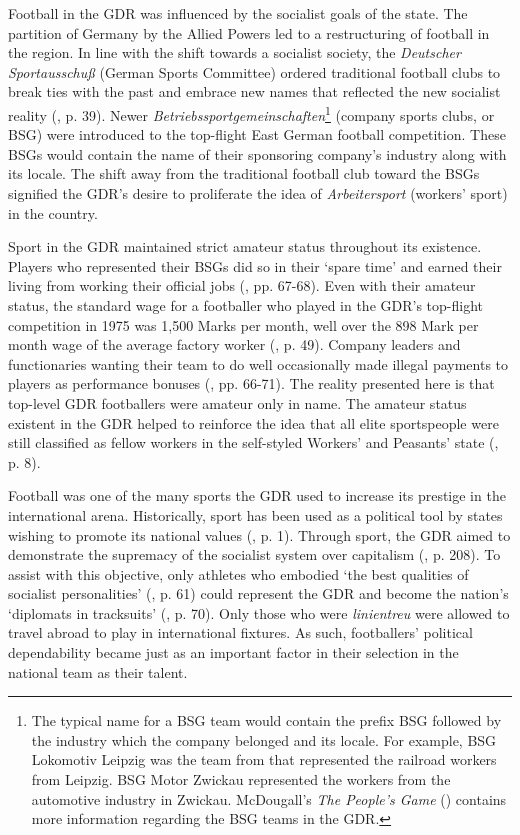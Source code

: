 Football in the GDR was influenced by the socialist goals of the state. The partition of Germany by the Allied Powers led to a restructuring of football in the region. In line with the shift towards a socialist society, the \textit{Deutscher Sportausschuß} (German Sports Committee) ordered traditional football clubs to break ties with the past and embrace new names that reflected the new socialist reality (\cite{mcdougall2014}, p. 39). Newer \textit{Betriebssportgemeinschaften}\footnote{The typical name for a BSG team would contain the prefix BSG followed by the industry which the company belonged and its locale. For example, BSG Lokomotiv Leipzig was the team from that represented the railroad workers from Leipzig. BSG Motor Zwickau represented the workers from the automotive industry in Zwickau. McDougall’s \textit{The People’s Game} (\citeyear{mcdougall2014}) contains more information regarding the BSG teams in the GDR.} (company sports clubs, or BSG) were introduced to the top-flight East German football competition. These BSGs would contain the name of their sponsoring company’s industry  along with its locale. The shift away from the traditional football club toward the BSGs signified the GDR’s desire to proliferate the idea of \textit{Arbeitersport} (workers’ sport) in the country.

Sport in the GDR maintained strict amateur status throughout its existence. Players who represented their BSGs did so in their ‘spare time’ and earned their living from working their official jobs (\cite{mcdougall2014}, pp. 67-68). Even with their amateur status, the standard wage for a footballer who played in the GDR’s top-flight competition in 1975 was 1,500 Marks per month, well over the 898 Mark per month wage of the average factory worker (\cite{wolle1998}, p. 49). Company leaders and functionaries wanting their team to do well occasionally made illegal payments to players as performance bonuses (\cite{mcdougall2014}, pp. 66-71). The reality presented here is that top-level GDR footballers were amateur only in name. The amateur status existent in the GDR helped to reinforce the idea that all elite sportspeople were still classified as fellow workers in the self-styled Workers’ and Peasants’ state (\cite{majorosmond2002}, p. 8).

Football was one of the many sports the GDR used to increase its prestige in the international arena. Historically, sport has been used as a political tool by states wishing to promote its national values (\cite{riordan1998}, p. 1). Through sport, the GDR aimed to demonstrate the supremacy of the socialist system over capitalism (\cite{dennis2000}, p. 208). To assist with this objective, only athletes who embodied ‘the best qualities of socialist personalities’ (\cite{mcdougall2014}, p. 61) could represent the GDR and become the nation’s ‘diplomats in tracksuits’ (\cite{dennisgrix2012}, p. 70). Only those who were \textit{linientreu} were allowed to travel abroad to play in international fixtures. As such, footballers’ political dependability became just as an important factor in their selection in the national team as their talent.

